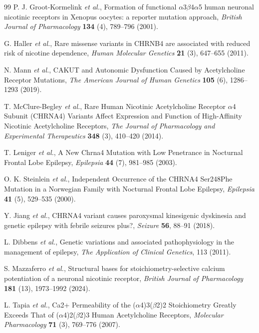 \documentclass{ws-procs11x85}
\begin{document}
\begin{thebibliography}{99}
P. J. Groot-Kormelink {\em et al.}, Formation of functional $\alpha$3$\beta$4$\alpha$5 human neuronal nicotinic receptors in Xenopus oocytes: a reporter mutation approach, {\em British Journal of Pharmacology} {\bf 134} (4), 789--796 (2001).

G. Haller {\em et al.}, Rare missense variants in CHRNB4 are associated with reduced risk of nicotine dependence, {\em Human Molecular Genetics} {\bf 21} (3), 647--655 (2011).

N. Mann {\em et al.}, CAKUT and Autonomic Dysfunction Caused by Acetylcholine Receptor Mutations, {\em The American Journal of Human Genetics} {\bf 105} (6), 1286--1293 (2019).

T. McClure-Begley {\em et al.}, Rare Human Nicotinic Acetylcholine Receptor $\alpha$4 Subunit (CHRNA4) Variants Affect Expression and Function of High-Affinity Nicotinic Acetylcholine Receptors, {\em The Journal of Pharmacology and Experimental Therapeutics} {\bf 348} (3), 410--420 (2014).

T. Leniger {\em et al.}, A New Chrna4 Mutation with Low Penetrance in Nocturnal Frontal Lobe Epilepsy, {\em Epilepsia} {\bf 44} (7), 981--985 (2003).

O. K. Steinlein {\em et al.}, Independent Occurrence of the CHRNA4 Ser248Phe Mutation in a Norwegian Family with Nocturnal Frontal Lobe Epilepsy, {\em Epilepsia} {\bf 41} (5), 529--535 (2000).

Y. Jiang {\em et al.}, CHRNA4 variant causes paroxysmal kinesigenic dyskinesia and genetic epilepsy with febrile seizures plus?, {\em Seizure} {\bf 56}, 88--91 (2018).

L. Dibbens {\em et al.}, Genetic variations and associated pathophysiology in the management of epilepsy, {\em The Application of Clinical Genetics}, 113 (2011).

S. Mazzaferro {\em et al.}, Structural bases for stoichiometry-selective calcium potentiation of a neuronal nicotinic receptor, {\em British Journal of Pharmacology} {\bf 181} (13), 1973--1992 (2024).

L. Tapia {\em et al.}, Ca2+ Permeability of the ($\alpha$4)3($\beta$2)2 Stoichiometry Greatly Exceeds That of ($\alpha$4)2($\beta$2)3 Human Acetylcholine Receptors, {\em Molecular Pharmacology} {\bf 71} (3), 769--776 (2007).


\end{thebibliography}
\end{document}
